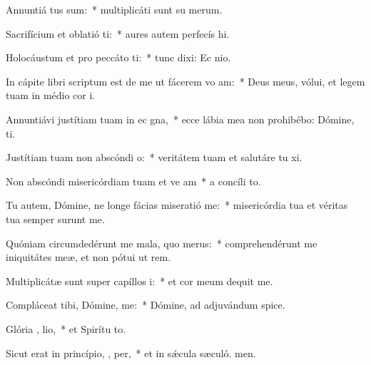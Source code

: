 \item Annuntiá  tus sum:~* multiplicáti sunt su merum.
\item Sacrifícium et oblatió ti:~* aures autem perfecís hi.
\item Holocáustum et pro peccáto  ti:~* tunc dixi: Ec nio.
\item In cápite libri scriptum est de me ut fácerem vo am:~* Deus meus, vólui, et legem tuam in médio cor i.
\item Annuntiávi justítiam tuam in ec gna,~* ecce lábia mea non prohibébo: Dómine,  ti.
\item Justítiam tuam non abscóndi   o:~* veritátem tuam et salutáre tu xi.
\item Non abscóndi misericórdiam tuam et ve am~* a concíli to.
\item Tu autem, Dómine, ne longe fácias miseratió   me:~* misericórdia tua et véritas tua semper surunt me.
\item Quóniam circumdedérunt me mala, quo   merus:~* comprehendérunt me iniquitátes meæ, et non pótui ut rem.
\item Multiplicátæ sunt super capíllos  i:~* et cor meum dequit me.
\item Compláceat tibi, Dómine,   me:~* Dómine, ad adjuvándum  spice.
\item Glória ,  lio,~* et Spirítu to.
\item Sicut erat in princípio,  ,  per,~* et in sǽcula sæculó. men.
